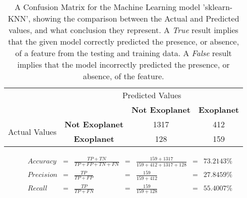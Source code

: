 
    \renewcommand{\arraystretch}{2}
    \renewcommand{\tabcolsep}{20.25pt}
    \begin{table}[ht]
    \begin{tabular}{cccc}
     & \multicolumn{3}{c}{Predicted Values} \\ \cline{3-4}
     & \multicolumn{1}{c|}{} & \multicolumn{1}{c|}{\textbf{Not Exoplanet}} & \multicolumn{1}{c|}{\textbf{Exoplanet}} \\ \cline{2-4}
    \multicolumn{1}{c|}{\multirow{2}{2.0cm}{Actual Values}} & \multicolumn{1}{c|}{\textbf{Not Exoplanet}} & \multicolumn{1}{c|}{1317} & \multicolumn{1}{c|}{412} \\ \cline{2-4}
    \multicolumn{1}{c|}{} & \multicolumn{1}{c|}{\textbf{Exoplanet}} & \multicolumn{1}{c|}{128} & \multicolumn{1}{c|}{159} \\ \cline{2-4}
    \end{tabular}
    \caption{A Confusion Matrix for the Machine Learning model 'sklearn-KNN', showing the comparison between the Actual and Predicted values, and what conclusion they represent. A \emph{True} result implies that the given model correctly predicted the presence, or absence, of a feature from the testing and training data. A \emph{False} result implies that the model incorrectly predicted the presence, or absence, of the feature.}
    \label{tab:sklearn-KNNconfusionmatrix}
    \end{table}

    \label{eq:precisionsklearn-KNN}
    \begin{align*}
        Accuracy &= &\frac{TP + TN}{TP + FP + TN + FN} &= &\frac{159 + 1317}{159 + 412 + 1317 + 128} &= & 73.2143\% \\
        Precision &= &\frac{TP}{TP + FP} &= &\frac{159}{159 + 412} &= & 27.8459\% \\
        Recall &= &\frac{TP}{TP + FN} &= &\frac{159}{159 + 128} &= & 55.4007\% \\
    \end{align*}

    \renewcommand{\arraystretch}{1}
    \renewcommand{\tabcolsep}{5.25pt}
    